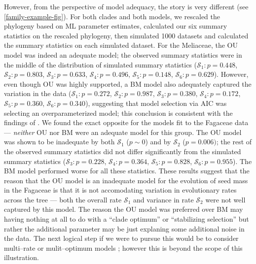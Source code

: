 \documentclass[a4paper,12pt]{article}
\begin{document}
However, from the perspective of model adequacy, the story is very different (see \ref{family-example-fig}). For both clades and both models, we rescaled the phylogeny based on ML parameter estimates, calculated our six summary statistics on the rescaled phylogeny, then simulated 1000 datasets and calculated the summary statistics on each simulated dataset. For the Meliaceae, the OU model was indeed an adequate model; the observed summary statistics were in the middle of the distribution of simulated summary statistics ($\mathcal{S}_1: p=0.448$, $\mathcal{S}_2: p=0.803$, $\mathcal{S}_3: p=0.633$, $\mathcal{S}_4:p=0.496$, $\mathcal{S}_5: p=0.148$, $\mathcal{S}_6: p=0.629$). However, even though OU was highly supported, a BM model also adequately captured the variation in the data ($\mathcal{S}_1: p=0.272$, $\mathcal{S}_2: p=0.987$, $\mathcal{S}_3: p=0.380$, $\mathcal{S}_4:p=0.172$, $\mathcal{S}_5: p=0.360$, $\mathcal{S}_6: p=0.340$), suggesting that model selection via AIC was selecting an overparameterized model; this conclusion is consistent with the findings of \citet{Boettiger2012}. We found the exact opposite for the models fit to the Fagaceae data --- \textit{neither} OU nor BM were an adequate model for this group. The OU model was shown to be inadequate by both $\mathcal{S}_1$ ($p \sim 0$) and by $\mathcal{S}_2$ ($p=0.006)$; the rest of the observed summary statistics did not differ significantly from the simulated summary statistics ($\mathcal{S}_3: p=0.228$, $\mathcal{S}_4:p=0.364$, $\mathcal{S}_5: p=0.828$, $\mathcal{S}_6: p=0.955$). The BM model performed worse for all these statistics. These results suggest that the reason that the OU model is an inadequate model for the evolution of seed mass in the Fagaceae is that it is not accomodating variation in evolutionary rates across the tree --- both the overall rate $\mathcal{S}_1$ and variance in rate $\mathcal{S}_2$ were not well captured by this model. The reason the OU model was preferred over BM may having nothing at all to do with a ``clade optimum'' or ``stabilizing selection'' but rather the additional parameter may be just explaning some additional noise in the data. The next logical step if we were to pursue this would be to consider multi--rate or mulit--optimum models \citep[e.g.][]{Omeara2006, Eastman2011, Beaulieu2012, UyedaBayou}; however this is beyond the scope of this illustration.
\end{document}
